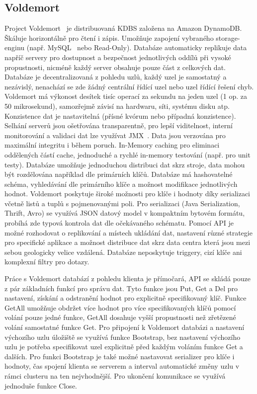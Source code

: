 \documentclass[czech,master,dept460,male,csharp,cpdeclaration]{diploma}
\begin{document}
	\subsection{Voldemort}
	
	Project Voldemort~\cite{voldemort} je distribuovaná KDBS založena na Amazon DynamoDB. Škáluje horizontálně pro čtení i zápis. Umožňuje zapojení vybraného storage-enginu (např. MySQL~\cite{mysql} nebo Read-Only). Databáze automaticky replikuje data napříč servery pro dostupnost a bezpečnost jednotlivých oddílů při vysoké propustnosti, nicméně každý server obsahuje pouze část z celkových dat. Databáze je decentralizovaná z pohledu uzlů, každý uzel je samostatný a nezávislý, nenachází se zde žádný centrální řídící uzel nebo uzel řídící řešení chyb. Voldemort má výkonost desítek tisíc operací za sekundu na jeden uzel (1 op. za 50 mikrosekund), samozřejmě závisí na hardwaru, síti, systému disku atp. Konzistence dat je nastavitelná (přísné kvórum nebo případná konzistence). Selhání serverů jsou ošetřována transparentně, pro lepší viditelnost, interní monitorování a validaci dat lze využívat JMX~\cite{jmx}. Data jsou verzována pro maximální integritu i během poruch. In-Memory caching pro eliminaci oddělených částí cache, jednoduché a rychlé in-memory testování (např. pro unit testy). Databáze umožňuje jednoduchou distribuci dat skrz stroje, data mohou být rozdělována například dle primárních klíčů. Databáze má hashovatelné schéma, vyhledávání dle primárního klíče a možnost modifikace jednotlivých hodnot. Voldemort poskytuje široké možnosti pro klíče i hodnoty díky serializaci včetně listů a tuplů s pojmenovanými poli. Pro serializaci (Java Serialization, Thrift, Avro) se využívá JSON datový model v kompaktním bytovém formátu, probíhá zde typová kontrola dat dle očekávaného schématu. Pomocí API je možné rozhodovat o replikování a místech ukládání dat, nastavení různé strategie pro specifické aplikace a možnost distribuce dat skrz data centra která jsou mezi sebou geologicky velice vzdálená. Databáze neposkytuje triggery, cizí klíče ani komplexní filtry pro dotazy.
	
	Práce s Voldemort databází z pohledu klienta je přímočará, API se skládá pouze z pár základních funkcí pro správu dat. Tyto funkce jsou Put, Get a Del pro nastavení, získání a odstranění hodnot pro explicitně specifikovaný klíč. Funkce GetAll umožňuje obdržet více hodnot pro více specifikovaných klíčů pomocí volání pouze jedné funkce, GetAll dosahuje vyšší propustnosti než zřetězené volání samostatné funkce Get. Pro připojení k Voldemort databázi a nastavení výchozího uzlu úložiště se využívá funkce Bootstrap, bez nastavení výchozího uzlu je potřeba specifikovat uzel explicitně před každým voláním funkce Get a dalších. Pro funkci Bootstrap je také možné nastavovat serializer pro klíče i hodnoty, čas spojení klienta se serverem a interval automatické změny uzlu v rámci clusteru na ten nejvhodnější. Pro ukončení komunikace se využívá jednoduše funkce Close.
	
\end{document}
